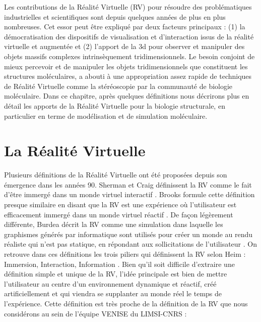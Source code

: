 Les contributions de la Réalité Virtuelle (RV) pour résoudre des problématiques industrielles et scientifiques sont depuis quelques années de plus en plus nombreuses. Cet essor peut être expliqué par deux facteurs principaux : (1) la démocratisation des dispositifs de visualisation et d'interaction issus de la réalité virtuelle et augmentée et (2) l'apport de la 3d pour observer et manipuler des objets massifs complexes intrinsèquement tridimensionnels. Le besoin conjoint de mieux percevoir et de manipuler les objets tridimensionnels que constituent les structures moléculaires, a abouti à une appropriation assez rapide de techniques de Réalité Virtuelle comme la stéréoscopie par la communauté de biologie moléculaire. Dans ce chapitre, après quelques définitions nous décrirons plus en détail les apports de la Réalité Virtuelle pour la biologie structurale, en particulier en terme de modélisation et de simulation moléculaire.

\section{La Réalité Virtuelle} \label{RV_science}


Plusieurs définitions de la Réalité Virtuelle ont été proposées depuis son émergence dans les années 90. Sherman et Craig définissent la RV comme le fait d'être immergé dans un monde virtuel interactif \cite{sherman2002understanding}. Brooks formule cette définition presque similaire en disant que la RV est une expérience où l'utilisateur est efficacement immergé dans un monde virtuel réactif \cite{brooks1999s}. De façon légèrement différente, Burdea décrit la RV comme une simulation dans laquelle les graphismes générés par informatique sont utilisés pour créer un monde au rendu réaliste qui n'est pas statique, en répondant aux sollicitations de l'utilisateur \cite{burdea2003virtual}. On retrouve dans ces définitions les trois piliers qui définissent la RV selon Heim : Immersion, Interaction, Information \cite{heim1998virtual}. Bien qu'il soit difficile d'extraire une définition simple et unique de la RV, l'idée principale est bien de mettre l'utilisateur au centre d'un environnement dynamique et réactif, créé artificiellement et qui viendra se supplanter au monde réel le temps de l'expérience. Cette définition est très proche de la définition de la RV que nous considérons au sein de l'équipe VENISE du LIMSI-CNRS \cite{bourdot_patrick_reconstruction_2002}:

